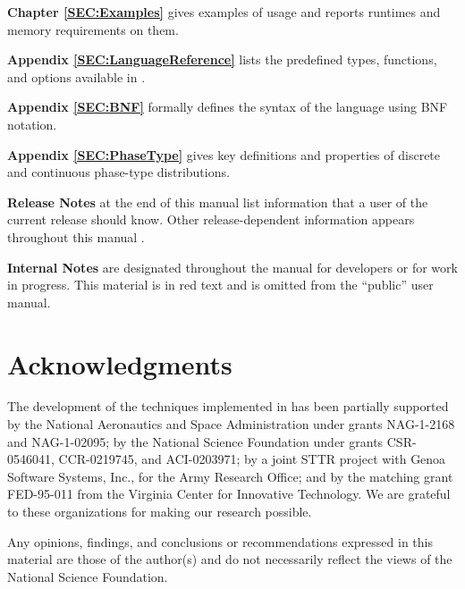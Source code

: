 \begin{description}
\item{\bf Chapter \ref{SEC:Examples}}
gives examples of {\smart} usage and reports runtimes and memory requirements
on them.

\item{\bf Appendix \ref{SEC:LanguageReference}}
lists the predefined types, functions, and options available in \smart.

\item{\bf Appendix \ref{SEC:BNF}}
formally defines the syntax of the {\smart} language using BNF notation.

\item{\bf Appendix \ref{SEC:PhaseType}}
gives key definitions and properties of
discrete and continuous phase-type distributions.

\item{\bf Release Notes}
at the end of this manual list information that a user of the current
release should know.
Other release-dependent information appears throughout this manual
.

\begin{private}
\item{\bf Internal Notes}
are designated throughout the manual for \smart{} developers or for 
work in progress.
This material is in red text and is omitted from the ``public'' user manual.
\end{private}

\end{description}

\vfill

\section*{\centering Acknowledgments}

The development of the techniques implemented in {\smart} has been partially
supported by the
National Aeronautics and Space Administration under grants
NAG-1-2168 and NAG-1-02095;
by the National Science Foundation under grants 
CSR-0546041, %
CCR-0219745, 
and
ACI-0203971;
by a joint STTR project with Genoa Software Systems,
Inc., for the Army Research Office;
and by the matching grant FED-95-011 from the Virginia Center for
Innovative Technology.
We are grateful to these organizations for making our research possible.

Any opinions, findings, and conclusions or recommendations expressed in this
material are those of the author(s) and do not necessarily reflect the views
of the National Science Foundation.

